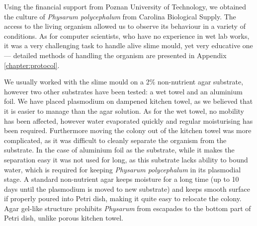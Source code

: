 Using the financial support from Poznan University of Technology, we obtained the culture of \textit{Physarum polycephalum} from Carolina Biological Supply. The access to the living organism allowed us to observe its behaviour in a variety of conditions. As for computer scientists, who have no experience in wet lab works, it was a very challenging task to handle alive slime mould, yet very educative one --- detailed methods of handling the organism are presented in Appendix \ref{chapter:protocol}.

We usually worked with the slime mould on a 2\% non-nutrient agar substrate, however two other substrates have been tested: a wet towel and an aluminium foil. We have placed plasmodium on dampened kitchen towel, as we believed that it is easier to manage than the agar solution. As for the wet towel, no mobility has been affected, however water evaporated quickly and regular moisturising has been required. Furthermore moving the colony out of the kitchen towel was more complicated, as it was difficult to cleanly separate the organism from the substrate. In the case of aluminium foil as the substrate, while it makes the separation easy it was not used for long, as this substrate lacks ability to bound water, which is required for keeping \textit{Physarum polycephalum} in its plasmodial stage. A standard non-nutrient agar keeps moisture for a long time (up to 10 days until the plasmodium is moved to new substrate) and keeps smooth surface if properly poured into Petri dish, making it quite easy to relocate the colony. Agar gel-like structure prohibits \textit{Physarum} from escapades to the bottom part of Petri dish, unlike porous kitchen towel. 

